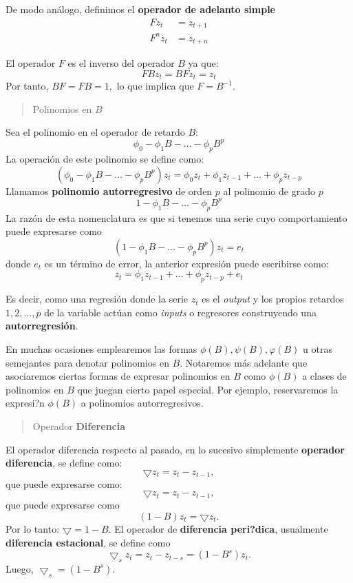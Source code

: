 \documentclass[]{book}
\begin{document}
De modo análogo, definimos el \textbf{operador de adelanto simple}
\[
\begin{align}
    Fz_t&=z_{t+1}\\
    F^n z_t&=z_{t+n}
\end{align}
\]

El operador \(F\) es el inverso del operador \(B\) ya que:
\[
FBz_t=BFz_t=z_t
\]
Por tanto, \(BF=FB=1,\) lo que implica que \(F=B^{-1}\).

\begin{quote}
Polinomios en \(B\)
\end{quote}

Sea el polinomio en el operador de retardo \(B\):
\[
\phi_0 - \phi_1 B - \ldots - \phi_pB^p
\]
La operación de este polinomio se define como:
\[
(\phi_0 - \phi_1 B - \ldots - \phi_pB^p)z_t=\phi_0z_t+\phi_1z_{t-1}+\ldots+\phi_pz_{t-p}
\]
Llamamos \textbf{polinomio autorregresivo} de orden \(p\) al polinomio de grado \(p\)
\[
1-\phi_1B-\dots-\phi_pB^p
\]
La razón de esta nomenclatura es que si tenemos una serie cuyo comportamiento puede expresarse como
\[
(1-\phi_1B-\dots-\phi_pB^p)z_t=e_t
\]
donde \(e_t\) es un término de error, la anterior expresión puede escribirse como:
\[
    z_t=\phi_1 z_{t-1}+ \ldots + \phi_p z_{t-p} + e_t
\]

Es decir, como una regresión donde la serie \(z_t\) es el \emph{output} y los propios retardos \(1,2,\ldots,p\) de la variable actúan como \emph{inputs} o regresores construyendo una \textbf{autorregresión}.

En muchas ocasiones emplearemos las formas \(\phi(B), \psi(B), \varphi(B)\) u otras semejantes para denotar polinomios en \(B\). Notaremos más adelante que asociaremos ciertas formas de expresar polinomios en \(B\) como \(\phi(B)\) a clases de polinomios en \(B\) que juegan cierto papel especial. Por ejemplo, reservaremos la expresi?n \(\phi(B)\) a polinomios autorregresivos.

\begin{quote}
Operador \textbf{Diferencia}
\end{quote}

El operador diferencia respecto al pasado, en lo sucesivo simplemente \textbf{operador diferencia}, se define como:
\[
\bigtriangledown z_t = z_t - z_{t-1},
\]
que puede expresarse como:
\[
\bigtriangledown z_t = z_t - z_{t-1},
\]
que puede expresarse como
\[
(1-B)z_t=\bigtriangledown z_t.
\]
Por lo tanto: \(\bigtriangledown =1-B\).
El operador de \textbf{diferencia peri?dica}, usualmente \textbf{diferencia estacional}, se define como
\[
\bigtriangledown_s z_t=z_t-z_{t-s}=(1-B^s)z_t.
\]
Luego, \(\bigtriangledown_s=(1-B^s).\)
\end{document}
